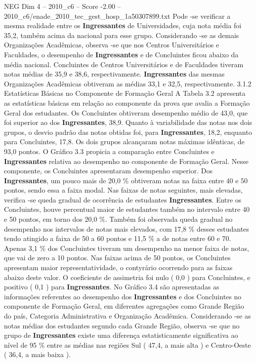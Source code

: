 \begin{textsample}{NEG Dim 4 – 2010\_c6 – Score -2.00 – 2010\_c6/enade\_2010\_tec\_gest\_hosp\_1a50307899.txt}
Pode -se verificar a mesma realidade entre os \textbf{Ingressantes} de Universidades, cuja nota média foi 35,2, também acima da nacional para esse grupo.
Considerando -se as demais Organizações Acadêmicas, observa -se que nos Centros Universitários e Faculdades, o desempenho de \textbf{Ingressantes} e de Concluintes ficou abaixo da média nacional.
Concluintes de Centros Universitários e de Faculdades tiveram notas médias de 35,9 e 38,6, respectivamente. \textbf{Ingressantes} das mesmas Organizações Acadêmicas obtiveram as médias 33,1 e 32,5, respectivamente. 3.1.2 Estatísticas Básicas no Componente de Formação Geral A Tabela 3.2 apresenta as estatísticas básicas em relação ao componente da prova que avalia a Formação Geral dos estudantes.
Os Concluintes obtiveram desempenho médio de 43,0, que foi superior ao dos \textbf{Ingressantes}, 38,9.
Quanto à variabilidade das notas nos dois grupos, o desvio padrão das notas obtidas foi, para \textbf{Ingressantes}, 18,2, enquanto para Concluintes, 17,8.
Os dois grupos alcançaram notas máximas idênticas, de 93,0 pontos.
O Gráfico 3.3 propicia a comparação entre Concluintes e \textbf{Ingressantes} relativa ao desempenho no componente de Formação Geral.
Nesse componente, os Concluintes apresentaram desempenho superior.
Dos \textbf{Ingressantes}, um pouco mais de 20,0 \% obtiveram notas na faixa entre 40 e 50 pontos, sendo essa a faixa modal.
Nas faixas de notas seguintes, mais elevadas, verifica -se queda gradual de ocorrência de estudantes \textbf{Ingressantes}.
Entre os Concluintes, houve percentual maior de estudantes também no intervalo entre 40 e 50 pontos, em torno dos 20,0 \%.
Também foi observada queda gradual no desempenho nos intervalos de notas mais elevados, com 17,8 \% desses estudantes tendo atingido a faixa de 50 a 60 pontos e 11,5 \% a de notas entre 60 e 70.
Apenas 3,1 \% dos Concluintes tiveram um desempenho na menor faixa de notas, que vai de zero a 10 pontos.
Nas faixas acima de 50 pontos, os Concluintes apresentam maior representatividade, o contyrário ocorrendo para as faixas abaixo deste valor.
O coeficiente de assimetria foi nulo ( 0,0 ) para Concluintes, e positivo ( 0,1 ) para \textbf{Ingressantes}.
No Gráfico 3.4 são apresentadas as informações referentes ao desempenho dos \textbf{Ingressantes} e dos Concluintes no componente de Formação Geral, em diferentes agregações como Grande Região do país, Categoria Administrativa e Organização Acadêmica.
Considerando -se as notas médias dos estudantes segundo cada Grande Região, observa -se que no grupo de \textbf{Ingressantes} existe uma diferença estatisticamente significativa ao nível de 95 \% entre as médias nas regiões Sul ( 47,4, a mais alta ) e Centro-Oeste ( 36,4, a mais baixa ).

\end{textsample}
